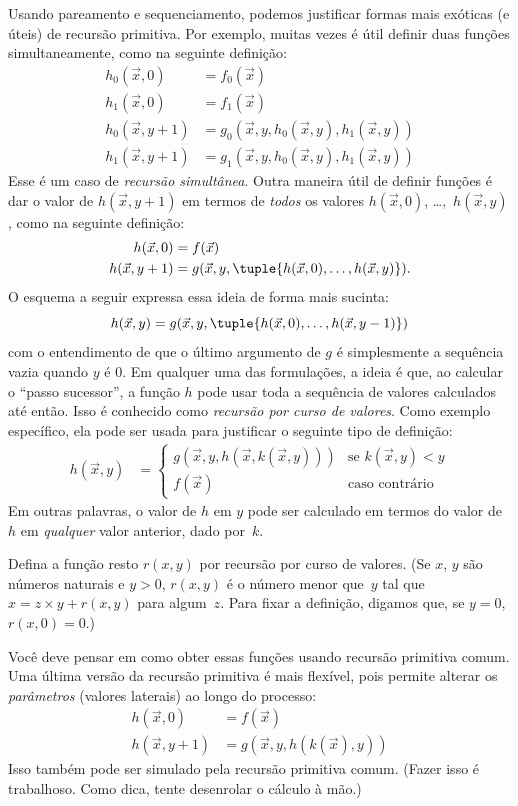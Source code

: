 \documentclass[../../../include/open-logic-section]{subfiles}
\begin{document}

Usando pareamento e sequenciamento, podemos justificar formas mais
exóticas (e úteis) de recursão primitiva. Por exemplo, muitas vezes é
útil definir duas funções simultaneamente, como na seguinte definição:
\begin{align*}
h_0(\vec x, 0) & = f_0(\vec x) \\
h_1(\vec x, 0) & = f_1(\vec x) \\
h_0(\vec x, y+1) & = g_0(\vec x, y, h_0(\vec x, y), h_1(\vec x, y)) \\
h_1(\vec x, y+1) & = g_1(\vec x, y, h_0(\vec x, y), h_1(\vec x, y))
\end{align*}
Esse é um caso de \emph{recursão simultânea}. Outra maneira útil de
definir funções é dar o valor de $h(\vec x, y+1)$ em termos de
\emph{todos} os valores $h(\vec x, 0)$, \dots,~$h(\vec x, y)$, como
na seguinte definição:
\begin{align*}
h(\vec x, 0) & = f(\vec x) \\
h(\vec x, y+1) & = g(\vec x, y, \tuple{h(\vec x, 0), \dots, h(\vec x, y)}).
\end{align*}
O esquema a seguir expressa essa ideia de forma mais sucinta:
\[
h(\vec x, y) = g(\vec x, y, \tuple{h(\vec x, 0), \dots, h(\vec x, y-1)})
\]
com o entendimento de que o último argumento de $g$ é simplesmente a
sequência vazia quando $y$ é $0$. Em qualquer uma das formulações, a
ideia é que, ao calcular o ``passo sucessor'', a função $h$ pode usar
toda a sequência de valores calculados até então.
Isso é conhecido como \emph{recursão por curso de valores}. Como exemplo
específico, ela pode ser usada para justificar o seguinte tipo de
definição:
\begin{align*}
h(\vec x, y) & = \begin{cases}
  g(\vec x, y, h(\vec x, k(\vec x, y))) & \text{se $k(\vec x, y) < y$} \\
  f(\vec x) & \text{caso contrário}
\end{cases}
\end{align*}
Em outras palavras, o valor de $h$ em $y$ pode ser calculado em termos
do valor de $h$ em \emph{qualquer} valor anterior, dado por~$k$.


\begin{prob}
  Defina a função resto $r(x,y)$ por recursão por curso de valores.
  (Se $x$, $y$ são números naturais e $y > 0$, $r(x,y)$ é o número
  menor que~$y$ tal que $x = z\times y + r(x,y)$ para algum~$z$.
  Para fixar a definição, digamos que, se $y=0$, $r(x,0) = 0$.)
\end{prob}

Você deve pensar em como obter essas funções usando recursão primitiva
comum. Uma última versão da recursão primitiva é mais flexível, pois
permite alterar os \emph{parâmetros} (valores laterais) ao longo do
processo:
\begin{align*}
h(\vec x, 0) & = f(\vec x) \\
h(\vec x, y+1) & = g(\vec x, y, h(k(\vec x), y))
\end{align*}
Isso também pode ser simulado pela recursão primitiva comum. (Fazer
isso é trabalhoso. Como dica, tente desenrolar o cálculo à mão.)
\end{document}
